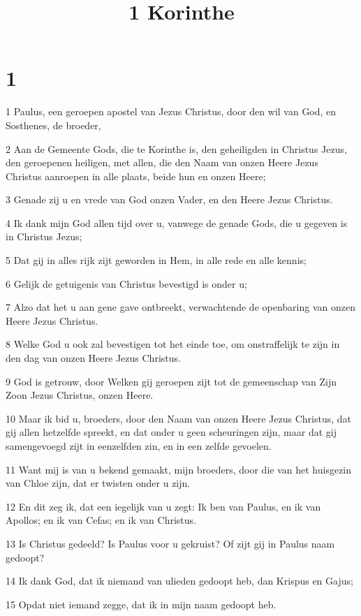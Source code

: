 

\title{1 Korinthe}



\chapter{1}

\par 1 Paulus, een geroepen apostel van Jezus Christus, door den wil van God, en Sosthenes, de broeder,
\par 2 Aan de Gemeente Gods, die te Korinthe is, den geheiligden in Christus Jezus, den geroepenen heiligen, met allen, die den Naam van onzen Heere Jezus Christus aanroepen in alle plaats, beide hun en onzen Heere;
\par 3 Genade zij u en vrede van God onzen Vader, en den Heere Jezus Christus.
\par 4 Ik dank mijn God allen tijd over u, vanwege de genade Gods, die u gegeven is in Christus Jezus;
\par 5 Dat gij in alles rijk zijt geworden in Hem, in alle rede en alle kennis;
\par 6 Gelijk de getuigenis van Christus bevestigd is onder u;
\par 7 Alzo dat het u aan gene gave ontbreekt, verwachtende de openbaring van onzen Heere Jezus Christus.
\par 8 Welke God u ook zal bevestigen tot het einde toe, om onstraffelijk te zijn in den dag van onzen Heere Jezus Christus.
\par 9 God is getrouw, door Welken gij geroepen zijt tot de gemeenschap van Zijn Zoon Jezus Christus, onzen Heere.
\par 10 Maar ik bid u, broeders, door den Naam van onzen Heere Jezus Christus, dat gij allen hetzelfde spreekt, en dat onder u geen scheuringen zijn, maar dat gij samengevoegd zijt in eenzelfden zin, en in een zelfde gevoelen.
\par 11 Want mij is van u bekend gemaakt, mijn broeders, door die van het huisgezin van Chloe zijn, dat er twisten onder u zijn.
\par 12 En dit zeg ik, dat een iegelijk van u zegt: Ik ben van Paulus, en ik van Apollos; en ik van Cefas; en ik van Christus.
\par 13 Is Christus gedeeld? Is Paulus voor u gekruist? Of zijt gij in Paulus naam gedoopt?
\par 14 Ik dank God, dat ik niemand van ulieden gedoopt heb, dan Krispus en Gajus;
\par 15 Opdat niet iemand zegge, dat ik in mijn naam gedoopt heb.
